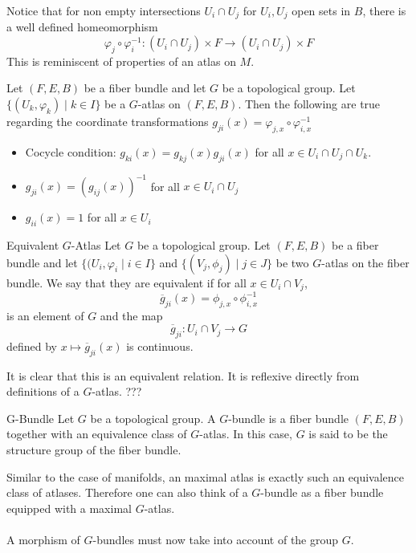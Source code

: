 \documentclass[a4paper]{article}
\begin{document}
Notice that for non empty intersections $U_i\cap U_j$ for $U_i,U_j$ open sets in $B$, there is a well defined homeomorphism $$\varphi_j\circ\varphi_i^{-1}:(U_i\cap U_j)\times F\to(U_i\cap U_j)\times F$$ This is reminiscent of properties of an atlas on $M$. 

\begin{lmm}{}{} Let $(F,E,B)$ be a fiber bundle and let $G$ be a topological group. Let $\{(U_k,\varphi_k)\;|\;k\in I\}$ be a $G$-atlas on $(F,E,B)$. Then the following are true regarding the coordinate transformations $g_{ji}(x)=\varphi_{j,x}\circ\varphi_{i,x}^{-1}$
\begin{itemize}
\item Cocycle condition: $g_{ki}(x)=g_{kj}(x)g_{ji}(x)$ for all $x\in U_i\cap U_j\cap U_k$. 
\item $g_{ji}(x)=(g_{ij}(x))^{-1}$ for all $x\in U_i\cap U_j$
\item $g_{ii}(x)=1$ for all $x\in U_i$
\end{itemize}
\end{lmm}

\begin{defn}{Equivalent $G$-Atlas}{} Let $G$ be a topological group. Let $(F,E,B)$ be a fiber bundle and let $\{(U_i,\varphi_i\;|\;i\in I\}$ and $\{(V_j,\phi_j)\;|\;j\in J\}$ be two $G$-atlas on the fiber bundle. We say that they are equivalent if for all $x\in U_i\cap V_j$, $$\overline{g}_{ji}(x)=\phi_{j,x}\circ\phi_{i,x}^{-1}$$ is an element of $G$ and the map $$\overline{g}_{ji}:U_i\cap V_j\to G$$ defined by $x\mapsto\overline{g}_{ji}(x)$ is continuous. 
\end{defn}

It is clear that this is an equivalent relation. It is reflexive directly from definitions of a $G$-atlas. ???

\begin{defn}{G-Bundle}{} Let $G$ be a topological group. A $G$-bundle is a fiber bundle $(F,E,B)$ together with an equivalence class of $G$-atlas. In this case, $G$ is said to be the structure group of the fiber bundle. 
\end{defn}

Similar to the case of manifolds, an maximal atlas is exactly such an equivalence class of atlases. Therefore one can also think of a $G$-bundle as a fiber bundle equipped with a maximal $G$-atlas. \\~\\

A morphism of $G$-bundles must now take into account of the group $G$. 
\end{document}
